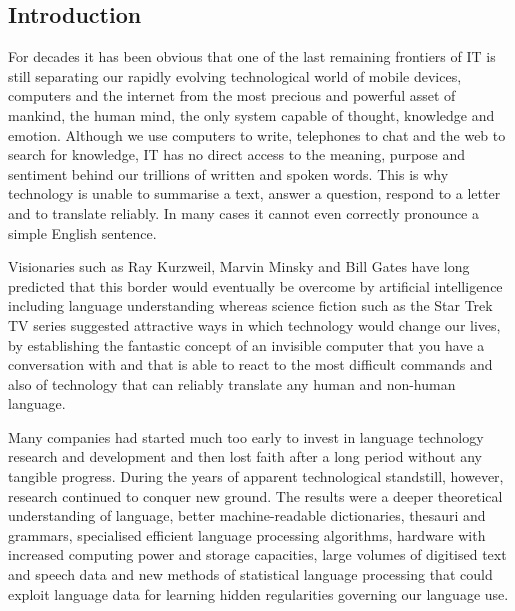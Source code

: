 \documentclass[10pt, plain]{../../metanetpaper}
\begin{document}
\clearpage



\label{sec:pts}


\begin{multicols}{2}
\subsection{Introduction}
\label{sec:pt-introduction}

For decades it has been obvious that one of the last remaining frontiers of IT is still separating our rapidly evolving technological world of mobile devices, computers and the internet from the most precious and powerful asset of mankind, the human mind, the only system capable of thought, knowledge and emotion. Although we use computers to write, telephones to chat and the web to search for knowledge, IT has no direct access to the meaning, purpose and sentiment behind our trillions of written and spoken words. This is why technology is unable to summarise a text, answer a question, respond to a letter and to translate reliably. In many cases it cannot even correctly pronounce a simple English sentence.

Visionaries such as Ray Kurzweil, Marvin Minsky and Bill Gates have long predicted that this border would eventually be overcome by artificial intelligence including language understanding whereas science fiction such as the Star Trek TV series suggested attractive ways in which technology would change our lives, by establishing the fantastic concept of an invisible computer that you have a conversation with and that is able to react to the most difficult commands and also of technology that can reliably translate any human and non-human language.

Many companies had started much too early to invest in language technology research and development and then lost faith after a long period without any tangible progress. During the years of apparent technological standstill, however, research continued to conquer new ground. The results were a deeper theoretical understanding of language, better machine-readable dictionaries, thesauri and grammars, specialised efficient language processing algorithms, hardware with increased computing power and storage capacities, large volumes of digitised text and speech data and new methods of statistical language processing that could exploit language data for learning hidden regularities governing our language use.


\end{multicols}
\end{document}
